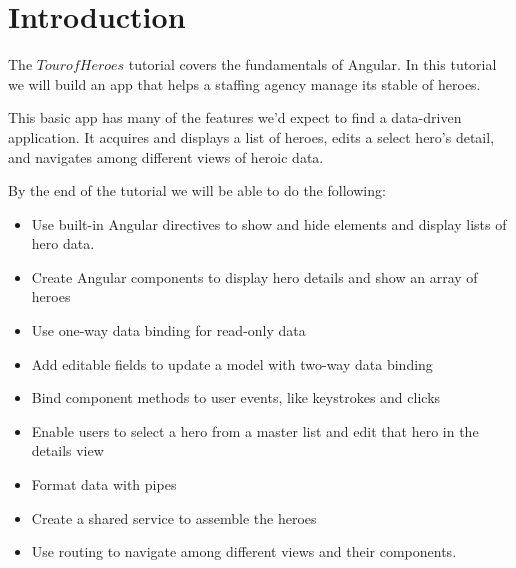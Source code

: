 \chapter{Introduction}
The $Tour of Heroes$ tutorial covers the fundamentals of
Angular. In this tutorial we will build an app that helps
a staffing agency manage its stable of heroes.

This basic app has many of the features we'd expect to find
a data-driven application. It acquires and displays a list
of heroes, edits a select hero's detail, and navigates
among different views of heroic data.

By the end of the tutorial we will be able to do the
following:
\begin{itemize}
    \item Use built-in Angular directives to show and hide
    elements and display lists of hero data.
    \item Create Angular components to display hero details
    and show an array of heroes
    \item Use one-way data binding for read-only data
    \item Add editable fields to update a model with
    two-way data binding
    \item Bind component methods to user events, like
    keystrokes and clicks
    \item Enable users to select a hero from a master list
    and edit that hero in the details view
    \item Format data with pipes
    \item Create a shared service to assemble the heroes
    \item Use routing to navigate among different views and
    their components.
\end{itemize}